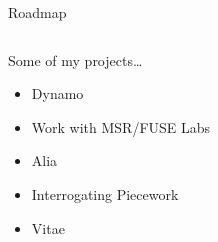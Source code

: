 \documentclass[presentation]{subfiles}
\begin{document}
\begin{frame}{Roadmap}
\begin{columns}[T]
    \begin{column}{0.5\textwidth}
    \large{Some of my projects\dots}
  \begin{itemize}
  \item<0,1,6>[] Dynamo
  \item<0,2,6>[] Work with MSR/FUSE Labs
  \item<0,3,6>[] Alia
  \item<0,4,6>[] Interrogating Piecework
  \item<0,5,6>[] Vitae
  \end{itemize}
\end{column}
    \begin{column}{0.5\textwidth}
\end{column}
\end{columns}

\end{frame}
\end{document}
